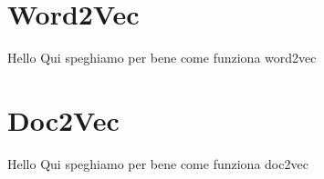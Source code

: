 \documentclass[british]{beamer}
\begin{document}
\section{Word2Vec}

\begin{frame}{Hello}
	Qui speghiamo per bene come funziona word2vec
\end{frame}

\section{Doc2Vec}

\begin{frame}{Hello}
	Qui speghiamo per bene come funziona doc2vec
\end{frame}
\end{document}
